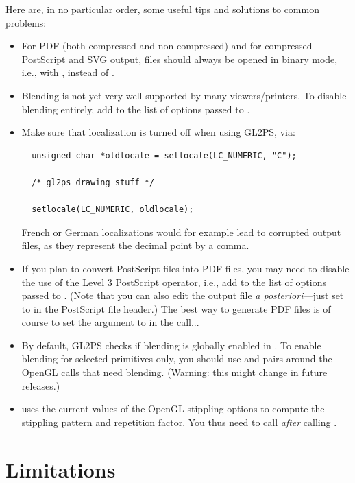 Here are, in no particular order, some useful tips and solutions to common
problems:
\begin{itemize}
\item For PDF (both compressed and non-compressed) and for compressed
  PostScript and SVG output, files should always be opened in binary
  mode, i.e., with , instead of .
\item Blending is not yet very well supported by many viewers/printers. To
  disable blending entirely, add  to the list of
  options passed to .
\item Make sure that localization is turned off when using GL2PS, via:
\begin{verbatim}
  unsigned char *oldlocale = setlocale(LC_NUMERIC, "C");

  /* gl2ps drawing stuff */

  setlocale(LC_NUMERIC, oldlocale);
\end{verbatim}
  French or German localizations would for example lead to corrupted output
  files, as they represent the decimal point by a comma.
\item If you plan to convert PostScript files into PDF files, you may need
  to disable the use of the Level 3 PostScript  operator, i.e.,
  add  to the list of options passed to
  . (Note that you can also edit the output file \emph{a
    posteriori}---just set  to  in the
  PostScript file header.) The best way to generate PDF files is of course
  to set the  argument to  in the
   call...
\item By default, GL2PS checks if blending is globally enabled in
  . To enable blending for selected primitives
  only, you should use  and
   pairs around the OpenGL calls that
  need blending. (Warning: this might change in future releases.)
\item {} uses the current values of
  the OpenGL stippling options to compute the stippling pattern and
  repetition factor. You thus need to call
   \emph{after} calling
  .
 \end{itemize}

\section{Limitations}
\label{sec:limitations}

